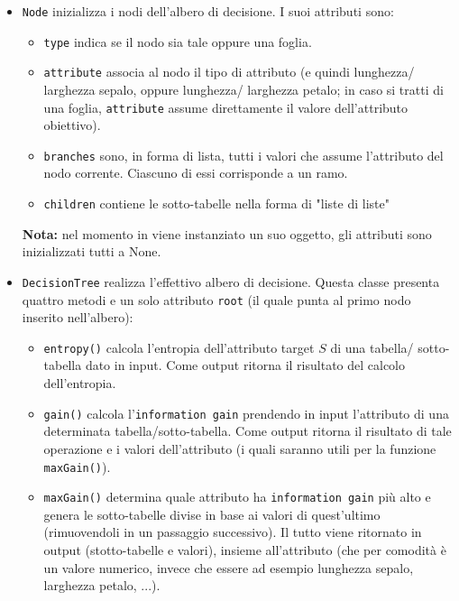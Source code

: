\documentclass[]{article}
\begin{document}
\begin {itemize}
    \item \texttt{Node} inizializza i nodi dell'albero di decisione. I suoi attributi sono:
        \begin{itemize}
            \item \texttt{type} indica se il nodo sia tale oppure una foglia.
            \item \texttt{attribute} associa al nodo il tipo di attributo 
                (e quindi lunghezza/ larghezza sepalo, oppure lunghezza/ larghezza petalo; 
                in caso si tratti di una foglia, \texttt{attribute} assume direttamente il valore dell'attributo obiettivo). 
            \item \texttt{branches} sono, in forma di lista, tutti i valori che assume l'attributo del nodo corrente. Ciascuno di essi corrisponde a un ramo.
            \item \texttt{children} contiene le sotto-tabelle nella forma di "liste di liste"
        \end{itemize}
        \textbf{Nota:} nel momento in viene instanziato un suo oggetto, gli attributi sono inizializzati tutti a None.
    \item \texttt{DecisionTree} realizza l'effettivo albero di decisione. Questa classe presenta quattro metodi e un solo attributo \texttt{root} 
        (il quale punta al primo nodo inserito nell'albero):
        \begin{itemize}
            \item \texttt{entropy()} calcola l'entropia dell'attributo target $S$ di una tabella/ sotto-tabella dato in input. 
                Come output ritorna il risultato del calcolo dell'entropia.
            \item \texttt{gain()} calcola l'\texttt{information gain} prendendo in input l'attributo di una determinata tabella/sotto-tabella. 
                Come output ritorna il risultato di tale operazione e i valori dell'attributo 
                (i quali saranno utili per la funzione \texttt{maxGain()}).
            \item \texttt{maxGain()} determina quale attributo ha \texttt{information gain} più alto e genera le sotto-tabelle divise in base ai valori di quest'ultimo 
                (rimuovendoli in un passaggio successivo).
                Il tutto viene ritornato in output (stotto-tabelle e valori), insieme all'attributo (che per comodità è un valore numerico, 
                invece che essere ad esempio lunghezza sepalo, larghezza petalo, ...). 

\end{itemize}
\end{itemize}
\end{document}
